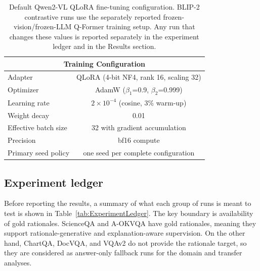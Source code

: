 \documentclass[preprint,12pt]{elsarticle}
\begin{document}
\begin{table}[!htbp]
\centering
\caption{Default Qwen2-VL QLoRA fine-tuning configuration. BLIP-2 contrastive runs use the separately reported frozen-vision/frozen-LLM Q-Former training setup. Any run that changes these values is reported separately in the experiment ledger and in the Results section.}
\label{tab:Config}
\begin{tabular}{|l|c|}
\hline
\multicolumn{2}{|c|}{\textbf{Training Configuration}} \\ \hline
Adapter & QLoRA (4-bit NF4, rank 16, scaling 32) \\
Optimizer & AdamW ($\beta_1$=0.9, $\beta_2$=0.999) \\
Learning rate & $2 \times 10^{-4}$ (cosine, 3\% warm-up) \\
Weight decay & 0.01 \\
Effective batch size & 32 with gradient accumulation \\
Precision & bf16 compute \\
Primary seed policy & one seed per complete configuration \\ \hline
\end{tabular}
\end{table}

\subsection{Experiment ledger}
Before reporting the results, a summary of what each group of runs is meant to test is shown in Table~\ref{tab:ExperimentLedger}.
The key boundary is availability of gold rationales.
ScienceQA and A-OKVQA have gold rationales, meaning they support rationale-generative and explanation-aware supervision.
On the other hand, ChartQA, DocVQA, and VQAv2 do not provide the rationale target, so they are considered as answer-only fallback runs for the domain and transfer analyses.
\end{document}

